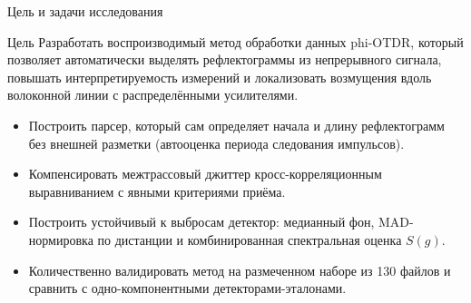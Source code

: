 \documentclass[aspectratio=169,11pt]{beamer}
\begin{document}
\begin{frame}{Цель и задачи исследования}
    \begin{block}{Цель}
        Разработать воспроизводимый метод обработки данных phi-OTDR, который позволяет автоматически выделять рефлектограммы из непрерывного сигнала, повышать интерпретируемость измерений и локализовать возмущения вдоль волоконной линии с распределёнными усилителями.
    \end{block}

    \vspace{0.5ex}
    \begin{itemize}
        \item Построить парсер, который сам определяет начала и длину рефлектограмм без внешней разметки (автооценка периода следования импульсов).
        \item Компенсировать межтрассовый джиттер кросс-корреляционным выравниванием с явными критериями приёма.
        \item Построить устойчивый к выбросам детектор: медианный фон, MAD-нормировка по дистанции и комбинированная спектральная оценка $S(g)$.
        \item Количественно валидировать метод на размеченном наборе из 130 файлов и сравнить с одно-компонентными детекторами-эталонами.
    \end{itemize}
\end{frame}
\end{document}
